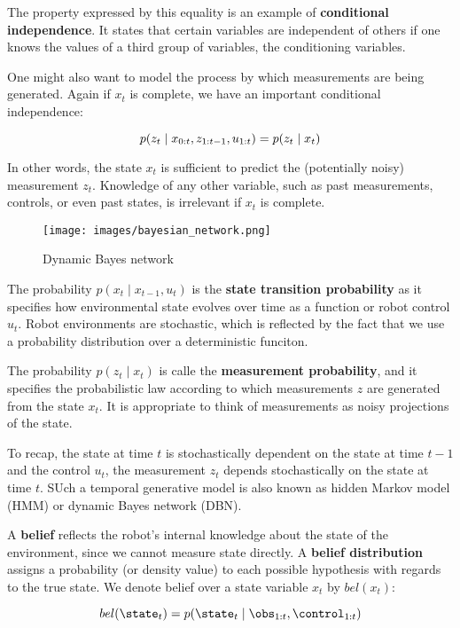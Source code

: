 The property expressed by this equality is an example of \textbf{conditional independence}.
It states that certain variables are independent of others if one knows the values of a third group of variables, the conditioning variables.

One might also want to model the process by which measurements are being generated.
Again if $x_t$ is complete, we have an important conditional independence:

\begin{equation}
  p(z_t \mid x_{0:t}, z_{1:t-1}, u_{1:t}) = p(z_t \mid x_{t}) \\
\end{equation}

In other words, the state $x_t$ is sufficient to predict the (potentially noisy) measurement $z_t$.
Knowledge of any other variable, such as past measurements, controls, or even past states, is irrelevant if $x_t$ is complete.

\begin{figure}[H]
  \centering
	\texttt{[image: images/bayesian\_network.png]}
	\caption{Dynamic Bayes network}
\end{figure}

The probability $p(x_t \mid x_{t-1}, u_t)$ is the \textbf{state transition probability} as it specifies how environmental state evolves over time as a function or robot control $u_t$.
Robot environments are stochastic, which is reflected by the fact that we use a probability distribution over a deterministic funciton.

\vspace{2mm}

The probability $p(z_t \mid x_t)$ is calle the \textbf{measurement probability}, and it specifies the probabilistic law according to which measurements $z$ are generated from the state $x_t$.
It is appropriate to think of measurements as noisy projections of the state.

\vspace{2mm}

To recap, the state at time $t$ is stochastically dependent on the state at time $t-1$ and the control $u_t$, the measurement $z_t$ depends stochastically on the state at time $t$.
SUch a temporal generative model is also known as hidden Markov model (HMM) or dynamic Bayes network (DBN).

\vspace{2mm}

\begin{definition}[Belief]
  A \textbf{belief} reflects the robot's internal knowledge about the state of the environment, since we cannot measure state directly.
  A \textbf{belief distribution} assigns a probability (or density value) to each possible hypothesis with regards to the true state.
  We denote belief over a state variable $x_t$ by $bel(x_t)$:

\begin{equation}
    bel(\state_t) = p(\state_t \mid \obs_{1:t}, \control_{1:t})
\end{equation}
\end{definition}

